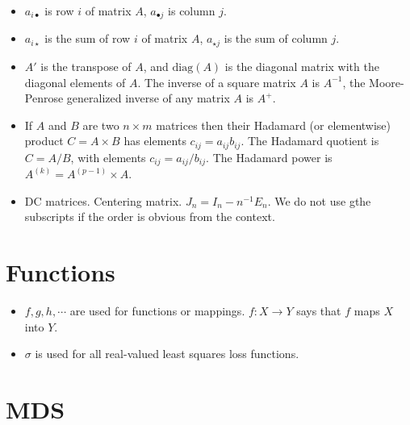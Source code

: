 \documentclass[
  12pt,
  letterpaper,
  DIV=11,
  numbers=noendperiod]{scrreprt}
\theoremstyle{remark}
\begin{document}
\begin{itemize}
\item
  \(a_{i\bullet}\) is row \(i\) of matrix \(A\), \(a_{\bullet j}\) is
  column \(j\).
\item
  \(a_{i\star}\) is the sum of row \(i\) of matrix \(A\),
  \(a_{\star j}\) is the sum of column \(j\).
\item
  \(A'\) is the transpose of \(A\), and \(\text{diag}(A)\) is the
  diagonal matrix with the diagonal elements of \(A\). The inverse of a
  square matrix \(A\) is \(A^{-1}\), the Moore-Penrose generalized
  inverse of any matrix \(A\) is \(A^+\).
\item
  If \(A\) and \(B\) are two \(n\times m\) matrices then their Hadamard
  (or elementwise) product \(C=A\times B\) has elements
  \(c_{ij}=a_{ij}b_{ij}\). The Hadamard quotient is \(C=A/B\), with
  elements \(c_{ij}=a_{ij}/b_{ij}\). The Hadamard power is
  \(A^{(k)}=A^{(p-1)}\times A\).
\item
  DC matrices. Centering matrix. \(J_n=I_n-n^{-1}E_n\). We do not use
  gthe subscripts if the order is obvious from the context.
\end{itemize}

\section*{Functions}\label{functions}


\begin{itemize}
\item
  \(f,g,h,\cdots\) are used for functions or mappings.
  \(f:X\rightarrow Y\) says that \(f\) maps \(X\) into \(Y\).
\item
  \(\sigma\) is used for all real-valued least squares loss functions.
\end{itemize}

\section*{MDS}\label{mds}

\end{document}
